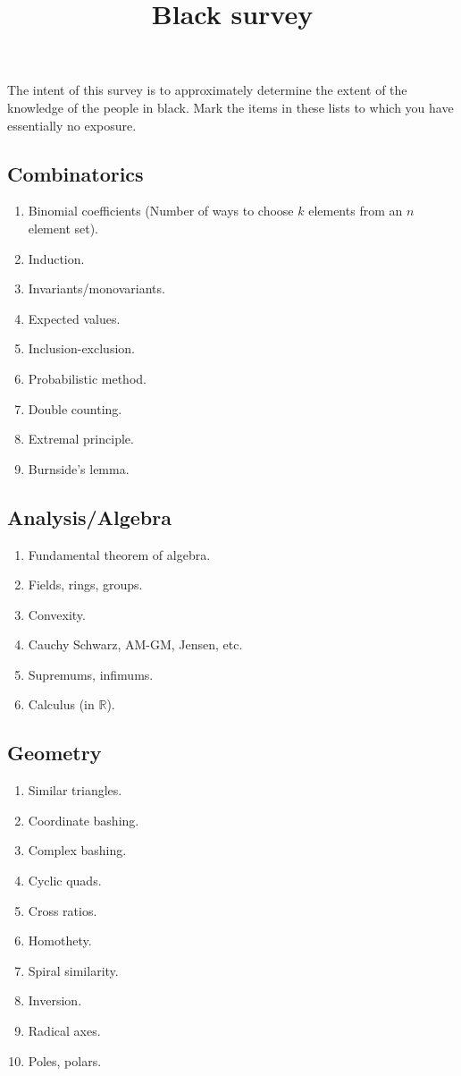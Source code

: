 \documentclass{article}
\begin{document}
\title{Black survey}
\section*{}
The intent of this survey is to approximately determine the extent of the knowledge of the people in black. Mark the items in these
lists to which you have essentially no exposure. 

\subsection*{Combinatorics}
\begin{enumerate}
\item Binomial coefficients (Number of ways to choose $k$ elements from an $n$ element set).
\item Induction.
\item Invariants/monovariants.
\item Expected values.
\item Inclusion-exclusion.
\item Probabilistic method.
\item Double counting.
\item Extremal principle.
\item Burnside's lemma.
\end{enumerate}

\subsection*{Analysis/Algebra}
\begin{enumerate}
\item Fundamental theorem of algebra.
\item Fields, rings, groups. 
\item Convexity.
\item Cauchy Schwarz, AM-GM, Jensen, etc.
\item Supremums, infimums.
\item Calculus (in $\mathbb{R}$).
\end{enumerate}

\subsection*{Geometry}
\begin{enumerate}
\item Similar triangles.
\item Coordinate bashing.
\item Complex bashing.
\item Cyclic quads. 
\item Cross ratios.
\item Homothety.
\item Spiral similarity.
\item Inversion.
\item Radical axes.
\item Poles, polars.
\end{enumerate}
\end{document}
